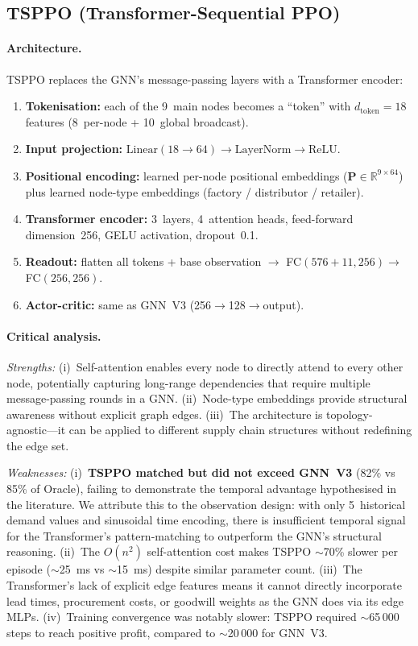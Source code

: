\subsection{TSPPO (Transformer-Sequential PPO)}

\paragraph{Architecture.}
TSPPO replaces the GNN's message-passing layers with a Transformer encoder:

\begin{enumerate}
  \item \textbf{Tokenisation:} each of the 9~main nodes becomes a
        ``token'' with $d_{\text{token}} = 18$ features (8~per-node + 10~global
        broadcast).
  \item \textbf{Input projection:} $\text{Linear}(18 \to 64) \to
        \text{LayerNorm} \to \text{ReLU}$.
  \item \textbf{Positional encoding:} learned per-node positional
        embeddings ($\mathbf{P} \in \mathbb{R}^{9 \times 64}$) plus
        learned node-type embeddings (factory / distributor / retailer).
  \item \textbf{Transformer encoder:} 3~layers, 4~attention heads,
        feed-forward dimension~256, GELU activation, dropout~0.1.
  \item \textbf{Readout:} flatten all tokens + base observation $\to$
        FC$(576 + 11, 256) \to$ FC$(256, 256)$.
  \item \textbf{Actor-critic:} same as GNN~V3 (256$\to$128$\to$output).
\end{enumerate}

\paragraph{Critical analysis.}
\emph{Strengths:} (i)~Self-attention enables every node to directly attend to
every other node, potentially capturing long-range dependencies that require
multiple message-passing rounds in a GNN. (ii)~Node-type embeddings provide
structural awareness without explicit graph edges. (iii)~The architecture is
topology-agnostic---it can be applied to different supply chain structures
without redefining the edge set.

\emph{Weaknesses:} (i)~\textbf{TSPPO matched but did not exceed GNN~V3}
(82\% vs 85\% of Oracle), failing to demonstrate the temporal advantage
hypothesised in the literature. We attribute this to the observation
design: with only 5~historical demand values and sinusoidal time encoding,
there is insufficient temporal signal for the Transformer's pattern-matching
to outperform the GNN's structural reasoning. (ii)~The $O(n^2)$
self-attention cost makes TSPPO $\sim$70\% slower per episode
($\sim$25~ms vs $\sim$15~ms) despite similar parameter count.
(iii)~The Transformer's lack of explicit edge features means it cannot
directly incorporate lead times, procurement costs, or goodwill weights
as the GNN does via its edge MLPs. (iv)~Training convergence was notably
slower: TSPPO required $\sim$65\,000 steps to reach positive profit,
compared to $\sim$20\,000 for GNN~V3.

